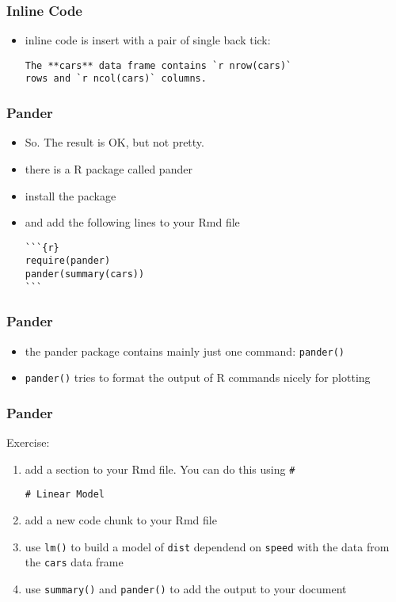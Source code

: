 \begin{frame}[fragile]\frametitle{Inline Code}
  \begin{itemize}
  \item inline code is insert with a pair of single back tick:
\begin{verbatim}
The **cars** data frame contains `r nrow(cars)`
rows and `r ncol(cars)` columns.
\end{verbatim}
  \end{itemize}
\end{frame}


\begin{frame}[fragile]\frametitle{Pander}
  \begin{itemize}
  \item So. The result is OK, but not pretty.
  \item there is a R package called pander
  \item install the package
  \item and add the following lines to your Rmd file
    
\begin{verbatim}
```{r}
require(pander)
pander(summary(cars))
```
\end{verbatim}
  
  \end{itemize}
\end{frame}


\begin{frame}\frametitle{Pander}
  \begin{itemize}
  \item the pander package contains mainly just one command: \texttt{pander()}
  \item \texttt{pander()} tries to format the output of R commands nicely for plotting
  \end{itemize}

\end{frame}

\begin{frame}[fragile]\frametitle{Pander}
Exercise:
  \begin{enumerate}
  \item add a section to your Rmd file. You can do this using \verb|#|
    
\begin{verbatim}
# Linear Model
\end{verbatim}
    
  \item add a new code chunk to your Rmd file
  \item use \texttt{lm()} to build a model of \texttt{dist} dependend on \texttt{speed} with the data from the \texttt{cars} data frame
  \item use \texttt{summary()} and \texttt{pander()} to add the output to your document
  \end{enumerate}
\end{frame}



